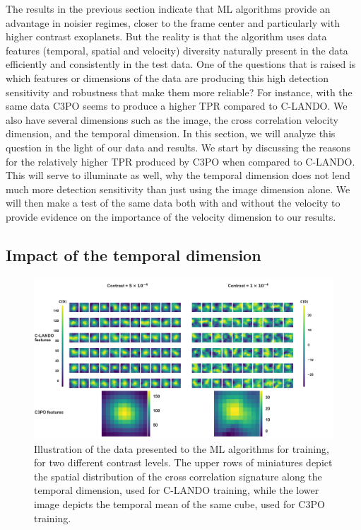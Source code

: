 \documentclass{aa}
\begin{document}
The results in the previous section indicate that ML algorithms provide an advantage in noisier regimes, closer to the frame center and particularly with higher contrast exoplanets.
But the reality is that the algorithm uses data features (temporal, spatial and velocity) diversity naturally present in the data efficiently and consistently in the test data.
One of the questions that is raised is which features or dimensions of the data are producing this high detection sensitivity and robustness that make them more reliable?
For instance, with the same data C3PO seems to produce a higher TPR compared to C-LANDO.
We also have several dimensions such as the image, the cross correlation velocity dimension, and the temporal dimension.
In this section, we will analyze this question in the light of our data and results.
We start by discussing the reasons for the relatively higher TPR produced by C3PO when compared to C-LANDO.
This will serve to illuminate as well, why the temporal dimension does not lend much more detection sensitivity than just using the image dimension alone.
We will then make a test of the same data both with and without the velocity to provide evidence on the importance of the velocity dimension to our results.

\subsection{Impact of the temporal dimension}

\begin{figure}
\centering
\includegraphics[width=\textwidth]{fig5_disc_dec2023_cropped.png}
\caption{Illustration of the data presented to the ML algorithms for training, for two different contrast levels. The upper rows of miniatures depict the spatial distribution of the cross correlation signature along the temporal dimension, used for C-LANDO training, while the lower image depicts the temporal mean of the same cube, used for C3PO training. }
\label{fig:disc-part1}
\end{figure}
\end{document}
